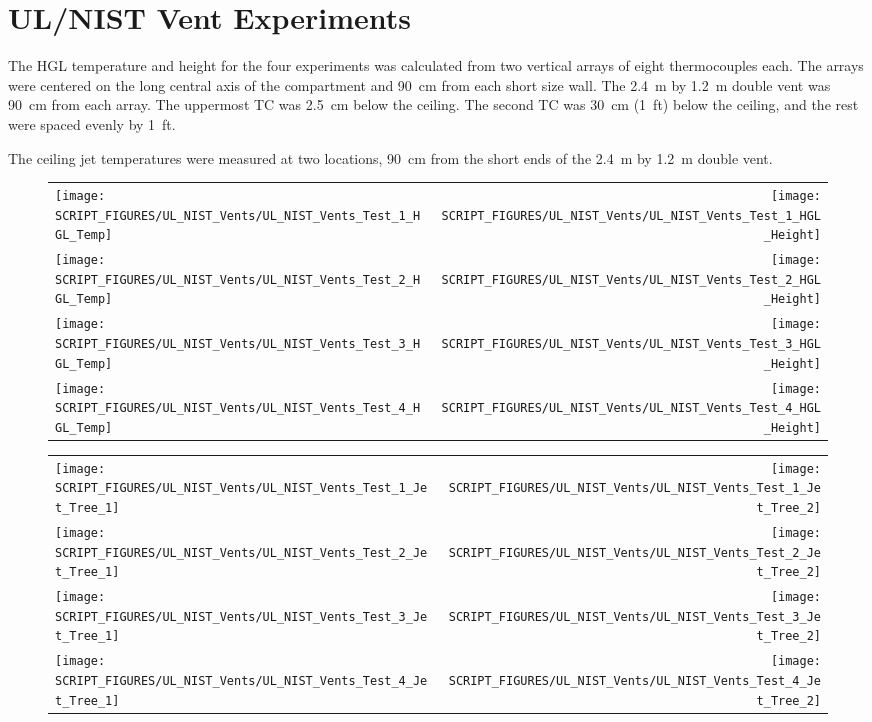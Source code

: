 \clearpage

\section{UL/NIST Vent Experiments}

The HGL temperature and height for the four experiments was calculated from two vertical arrays of eight thermocouples each. The arrays were centered on the long central axis of the compartment and 90~cm from each short size wall. The 2.4~m by 1.2~m double vent was 90~cm from each array. The uppermost TC was 2.5~cm below the ceiling. The second TC was 30~cm (1~ft) below the ceiling, and the rest were spaced evenly by 1~ft.

The ceiling jet temperatures were measured at two locations, 90~cm from the short ends of the 2.4~m by 1.2~m double vent.

\begin{figure}[p]
\begin{tabular*}{\textwidth}{l@{\extracolsep{\fill}}r}
\texttt{[image: SCRIPT\_FIGURES/UL\_NIST\_Vents/UL\_NIST\_Vents\_Test\_1\_HGL\_Temp]} &
\texttt{[image: SCRIPT\_FIGURES/UL\_NIST\_Vents/UL\_NIST\_Vents\_Test\_1\_HGL\_Height]} \\
\texttt{[image: SCRIPT\_FIGURES/UL\_NIST\_Vents/UL\_NIST\_Vents\_Test\_2\_HGL\_Temp]} &
\texttt{[image: SCRIPT\_FIGURES/UL\_NIST\_Vents/UL\_NIST\_Vents\_Test\_2\_HGL\_Height]} \\
\texttt{[image: SCRIPT\_FIGURES/UL\_NIST\_Vents/UL\_NIST\_Vents\_Test\_3\_HGL\_Temp]} &
\texttt{[image: SCRIPT\_FIGURES/UL\_NIST\_Vents/UL\_NIST\_Vents\_Test\_3\_HGL\_Height]} \\
\texttt{[image: SCRIPT\_FIGURES/UL\_NIST\_Vents/UL\_NIST\_Vents\_Test\_4\_HGL\_Temp]} &
\texttt{[image: SCRIPT\_FIGURES/UL\_NIST\_Vents/UL\_NIST\_Vents\_Test\_4\_HGL\_Height]}
\end{tabular*}
\end{figure}

\begin{figure}[p]
\begin{tabular*}{\textwidth}{l@{\extracolsep{\fill}}r}
\texttt{[image: SCRIPT\_FIGURES/UL\_NIST\_Vents/UL\_NIST\_Vents\_Test\_1\_Jet\_Tree\_1]} &
\texttt{[image: SCRIPT\_FIGURES/UL\_NIST\_Vents/UL\_NIST\_Vents\_Test\_1\_Jet\_Tree\_2]} \\
\texttt{[image: SCRIPT\_FIGURES/UL\_NIST\_Vents/UL\_NIST\_Vents\_Test\_2\_Jet\_Tree\_1]} &
\texttt{[image: SCRIPT\_FIGURES/UL\_NIST\_Vents/UL\_NIST\_Vents\_Test\_2\_Jet\_Tree\_2]} \\
\texttt{[image: SCRIPT\_FIGURES/UL\_NIST\_Vents/UL\_NIST\_Vents\_Test\_3\_Jet\_Tree\_1]} &
\texttt{[image: SCRIPT\_FIGURES/UL\_NIST\_Vents/UL\_NIST\_Vents\_Test\_3\_Jet\_Tree\_2]} \\
\texttt{[image: SCRIPT\_FIGURES/UL\_NIST\_Vents/UL\_NIST\_Vents\_Test\_4\_Jet\_Tree\_1]} &
\texttt{[image: SCRIPT\_FIGURES/UL\_NIST\_Vents/UL\_NIST\_Vents\_Test\_4\_Jet\_Tree\_2]}
\end{tabular*}
\label{UL_NIST_Ceiling_Jet}
\end{figure}



